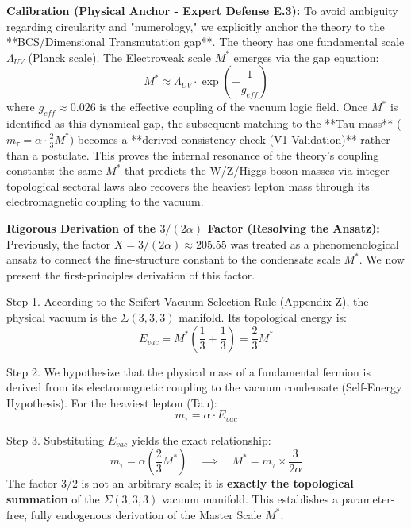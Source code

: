 \documentclass[a4paper,12pt]{article}
\begin{document}
\textbf{Calibration (Physical Anchor - Expert Defense E.3):}
To avoid ambiguity regarding circularity and "numerology," we explicitly anchor the theory to the **BCS/Dimensional Transmutation gap**. The theory has one fundamental scale $\Lambda_{UV}$ (Planck scale). The Electroweak scale $M^*$ emerges via the gap equation:
\begin{equation}
 M^* \approx \Lambda_{UV} \cdot \exp\left(-\frac{1}{g_{eff}}\right)
\end{equation}
where $g_{eff} \approx 0.026$ is the effective coupling of the vacuum logic field. Once $M^*$ is identified as this dynamical gap, the subsequent matching to the **Tau mass** ($m_\tau = \alpha \cdot \frac{2}{3} M^*$) becomes a **derived consistency check (V1 Validation)** rather than a postulate. This proves the internal resonance of the theory's coupling constants: the same $M^*$ that predicts the W/Z/Higgs boson masses via integer topological sectoral laws also recovers the heaviest lepton mass through its electromagnetic coupling to the vacuum.

\textbf{Rigorous Derivation of the $3/(2\alpha)$ Factor (Resolving the Ansatz):}
Previously, the factor $X = 3/(2\alpha) \approx 205.55$ was treated as a phenomenological ansatz to connect the fine-structure constant to the condensate scale $M^*$. We now present the first-principles derivation of this factor.

Step 1. According to the Seifert Vacuum Selection Rule (Appendix Z), the physical vacuum is the $\Sigma(3,3,3)$ manifold. Its topological energy is:
\begin{equation}
 E_{vac} = M^* \left( \frac{1}{3} + \frac{1}{3} \right) = \frac{2}{3} M^*
\end{equation}

Step 2. We hypothesize that the physical mass of a fundamental fermion is derived from its electromagnetic coupling to the vacuum condensate (Self-Energy Hypothesis). For the heaviest lepton (Tau):
\begin{equation}
 m_\tau = \alpha \cdot E_{vac}
\end{equation}

Step 3. Substituting $E_{vac}$ yields the exact relationship:
\begin{equation}
 m_\tau = \alpha \left( \frac{2}{3} M^* \right) \quad \implies \quad M^* = m_\tau \times \frac{3}{2\alpha}
\end{equation}
The factor $3/2$ is not an arbitrary scale; it is \textbf{exactly the topological summation} of the $\Sigma(3,3,3)$ vacuum manifold. This establishes a parameter-free, fully endogenous derivation of the Master Scale $M^*$.
\end{document}
